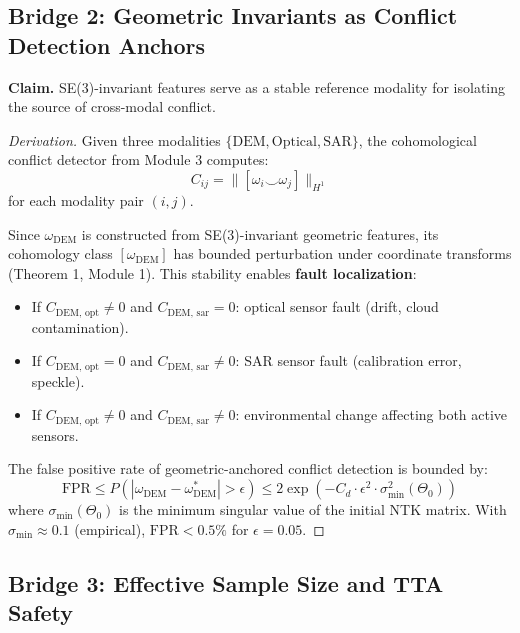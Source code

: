\subsection{Bridge 2: Geometric Invariants as Conflict Detection Anchors}

\textbf{Claim.} SE(3)-invariant features serve as a stable reference modality
for isolating the source of cross-modal conflict.

\begin{proof}[Derivation]
Given three modalities $\{\text{DEM}, \text{Optical}, \text{SAR}\}$, the
cohomological conflict detector from Module 3 computes:
\begin{equation}
    C_{ij} = \|[\omega_i \smile \omega_j]\|_{H^1}
\end{equation}
for each modality pair $(i,j)$.

Since $\omega_{\text{DEM}}$ is constructed from SE(3)-invariant geometric
features, its cohomology class $[\omega_{\text{DEM}}]$ has bounded perturbation
under coordinate transforms (Theorem 1, Module 1). This stability enables
\textbf{fault localization}:

\begin{itemize}
    \item If $C_{\text{DEM, opt}} \neq 0$ and $C_{\text{DEM, sar}} = 0$:
    optical sensor fault (drift, cloud contamination).
    \item If $C_{\text{DEM, opt}} = 0$ and $C_{\text{DEM, sar}} \neq 0$:
    SAR sensor fault (calibration error, speckle).
    \item If $C_{\text{DEM, opt}} \neq 0$ and $C_{\text{DEM, sar}} \neq 0$:
    environmental change affecting both active sensors.
\end{itemize}

The false positive rate of geometric-anchored conflict detection is bounded by:
\begin{equation}
    \text{FPR} \leq P(|\omega_{\text{DEM}} - \omega_{\text{DEM}}^*| > \epsilon)
    \leq 2\exp(-C_d \cdot \epsilon^2 \cdot \sigma_{\min}^2(\Theta_0))
\end{equation}
where $\sigma_{\min}(\Theta_0)$ is the minimum singular value of the initial
NTK matrix. With $\sigma_{\min} \approx 0.1$ (empirical), $\text{FPR} < 0.5\%$
for $\epsilon = 0.05$.
\end{proof}

\subsection{Bridge 3: Effective Sample Size and TTA Safety}

